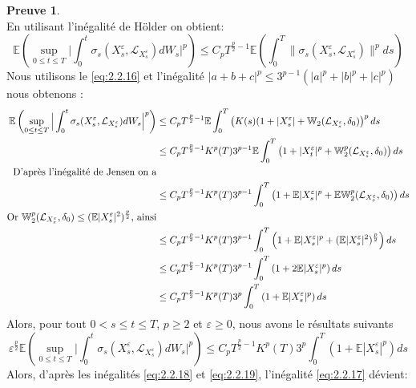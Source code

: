 \documentclass[12pt,a4paper,twoside,fleqn]{book}%
\theoremstyle{definition}
\newtheorem*{pr}{\textbf{Preuve}}
\theoremstyle{lemme}
\numberwithin{equation}{section}
\begin{document}
\begin{pr}
\[\]
En utilisant l'inégalité de Hölder on obtient:
\[
\mathbb{E}\left(\sup_{0\leq t \leq T}\Big|\int_{0}^{t}\sigma_s(X_s^\varepsilon,\mathcal{L}_{X_s^\varepsilon})dW_s\Big|^p\right)\leq C_p T^{\frac{p}{2}-1}\mathbb{E}\left(\int_{0}^{T}\|\sigma_s(X_s^\varepsilon, \mathcal{L}_{X_s^\varepsilon})\|^pds\right)
\]
Nous utilisons le \ref{eq:2.2.16} et l'inégalité $|a+b+c|^p\leq 3^{p-1}(|a|^p + |b|^p + |c|^p)$ nous obtenons :
\[
\begin{aligned}
\mathbb{E}\left(\sup_{0\leq t \leq T}\Big|\int_{0}^{t}\sigma_s(X_s^\varepsilon,\mathcal{L}_{X_s^\varepsilon})dW_s\Big|^p\right)&\leq C_p T^{\frac{p}{2}-1}\mathbb{E}\int_{0}^{T}\left(K(s)(1 + |X_s^\varepsilon| +\mathbb{W}_2(\mathcal{L}_{X_s^\varepsilon},\delta_0)\right)^p ds\\
&\leq C_p T^{\frac{p}{2}-1}K^p(T)3^{p-1}\mathbb{E}\int_{0}^{T}\left(1 +|X_t^\varepsilon|^p + \mathbb{W}_2^p(\mathcal{L}_{X_s^\varepsilon},\delta_0)\right)ds\\
\text{D'après l'inégalité de Jensen on a} \\
&\leq C_p T^{\frac{p}{2}-1}K^p(T)3^{p-1}\int_{0}^{T}\left(1 + \mathbb{E}|X_s^\varepsilon|^p + \mathbb{E}\mathbb{W}_2^p(\mathcal{L}_{X_s^\varepsilon},\delta_0)\right)ds \\
\text{Or $ \mathbb{W}_2^p(\mathcal{L}_{X_s^\varepsilon},\delta_0)\leq(\mathbb{E}|X_s^\varepsilon|^2)^{\frac{p}{2}}$, ainsi}\\
&\leq C_p T^{\frac{p}{2}-1}K^p(T)3^{p-1}\int_{0}^{T}\left(1 + \mathbb{E}|X_s^\varepsilon|^p + (\mathbb{E}|X_s^\varepsilon|^2)^\frac{p}{2}\right)ds \\ 
&\leq C_p T^{\frac{p}{2}-1}K^p(T)3^{p-1}\int_{0}^{T}\left(1 + 2\mathbb{E}|X_s^\varepsilon|^p\right)ds \\
&\leq C_p T^{\frac{p}{2}-1}K^p(T)3^{p}\int_{0}^{T}\left(1 + \mathbb{E}|X_s^\varepsilon|^p\right)ds
\end{aligned}
\]
Alors, pour tout $0< s\leq t\leq T$, $p\geq2$ et $\varepsilon\geq0$, nous avons le résultats suivants
\begin{equation}\label{eq:2.2.19}
	\varepsilon^{\frac{p}{2}}\mathbb{E}\left(\sup_{0\leq t \leq T}\Big|\int_{0}^{t}\sigma_s(X_s^\varepsilon,\mathcal{L}_{X_s^\varepsilon})dW_s\Big|^p\right)\leq C_p T^{\frac{p}{2}-1}K^p(T)3^{p}\int_{0}^{T}\left(1 + \mathbb{E}|X_s^\varepsilon|^p\right)ds
\end{equation}
Alors, d'après les inégalités \ref{eq:2.2.18} et \ref{eq:2.2.19}, l'inégalité \ref{eq:2.2.17} dévient:

\end{pr}
\end{document}
